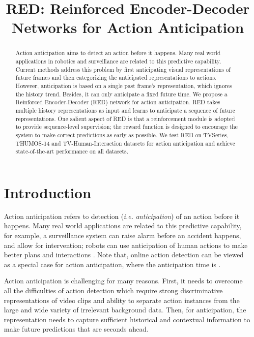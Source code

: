 \documentclass{bmvc2k}
\title{RED: Reinforced Encoder-Decoder Networks for Action Anticipation}
\begin{document}
\maketitle

\begin{abstract}
Action anticipation aims to detect an action before it happens. Many real world applications in robotics and surveillance are related to this predictive capability. Current methods address this problem by first anticipating visual representations of future frames and then categorizing the anticipated representations to actions. However, anticipation is based on a single past frame's representation, which ignores the history trend. Besides, it can only anticipate a fixed future time. We propose a Reinforced Encoder-Decoder (RED) network for action anticipation. RED takes multiple history representations as input and learns to anticipate a sequence of future representations. One salient aspect of RED is that a reinforcement module is adopted to provide sequence-level supervision; the reward function is designed to encourage the system to make correct predictions as early as possible. We test RED on TVSeries, THUMOS-14 and TV-Human-Interaction datasets for action anticipation and achieve state-of-the-art performance on all datasets. 
\end{abstract}

\section{Introduction}




Action anticipation refers to detection (\emph{i.e. anticipation}) of an action before it happens. Many real world applications are related to this predictive capability, for example,  a surveillance system can raise alarm before an accident happens, and allow for intervention; robots can use anticipation of human actions to make better plans and interactions \cite{koppula2013anticipating}. Note that, online action detection \cite{de2016online} can be viewed as a special case for action anticipation, where the anticipation time is .  


Action anticipation is challenging for many reasons. First, it needs to overcome all the difficulties of action detection which require strong discriminative representations of video clips and ability to separate action instances from the large and wide variety of irrelevant background data. Then, for anticipation, the representation needs to capture sufficient historical and contextual information to make future predictions that are seconds ahead.
\end{document}
